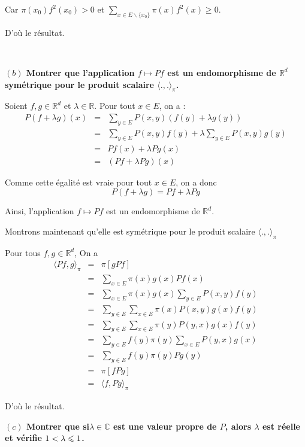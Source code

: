 Car $\pi (x_0) f^2 (x_0) > 0$ et $\underset{x \in E \backslash \{ x_0
\}}{\sum} \pi (x) f^2 (x) \geqslant 0$.

D'o{\`u} le r{\'e}sultat.

\

\textbf{$(b)$ Montrer que l'application $f \longmapsto P f$ est un endomorphisme de $\mathbb{R}^d$ sym{\'e}trique pour le produit scalaire $\langle ., . \rangle_{\pi}$. }

Soient $f, g \in \mathbb{R}^d$ et $\lambda \in \mathbb{R}$. Pour tout $x \in
E$, on a :
\begin{eqnarray*}
  P (f + \lambda g) (x) & = & \underset{y \in E}{\sum} P (x, y) (f (y) +
  \lambda g (y))\\
  & = & \underset{y \in E}{\sum} P (x, y) f (y) + \lambda \underset{y \in
  E}{\sum} P (x, y) g (y)\\
  & = & P f (x) + \lambda P g (x)\\
  & = & (P f + \lambda P g) (x)
\end{eqnarray*}


Comme cette {\'e}galit{\'e} est vraie pour tout $x \in E$, on a donc
\[ P (f + \lambda g) = P f + \lambda P g \]


Ainsi, l'application $f \longmapsto P f$ est un endomorphisme de
$\mathbb{R}^d$.

Montrons maintenant qu'elle est sym{\'e}trique pour le produit scalaire
$\langle ., . \rangle_{\pi}$

Pour tous $f, g \in \mathbb{R}^d$, On a
\begin{eqnarray*}
  \langle P f, g \rangle_{\pi} & = & \pi [g P f]\\
  & = & \underset{x \in E}{\sum} \pi (x) g (x) P f (x)\\
  & = & \sum_{x \in E} \pi (x) g (x) \sum_{y \in E} P (x, y) f (y)\\
  & = & \sum_{y \in E} \sum_{x \in E} \pi (x) P (x, y) g (x) f (y)\\
  & = & \sum_{y \in E} \sum_{x \in E} \pi (y) P (y, x) g (x) f (y)\\
  & = & \sum_{y \in E} f (y) \pi (y) \sum_{x \in E} P (y, x) g (x)\\
  & = & \sum_{y \in E} f (y) \pi (y) P g (y)\\
  & = & \pi [f P g]\\
  & = & \langle f, P g \rangle_{\pi}
\end{eqnarray*}


D'o{\`u} le r{\'e}sultat.

\textbf{$(c)$ Montrer que si$\lambda \in \mathbb{C}$ est une valeur
propre de $P$, alors $\lambda$ est r{\'e}elle et v{\'e}rifie
$\nonconverted{minus} 1 < \lambda \leqslant 1$.}

